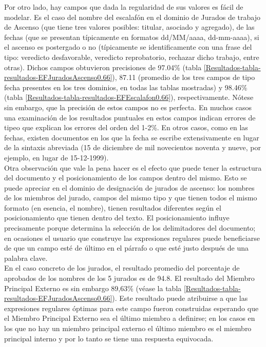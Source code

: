 Por otro lado, hay campos que dada la regularidad de sus valores es fácil de modelar. Es el caso del nombre del escalafón en el dominio de Jurados de trabajo de Ascenso (que tiene tres valores posibles: titular, asociado y agregado), de las fechas (que se presentan típicamente en formatos dd/MM/aaaa, dd-mm-aaaa), si el ascenso es postergado o no (típicamente se identificamente con una frase del tipo: veredicto desfavorable, veredicto reprobatorio, rechazar dicho trabajo, entre otras). Dichos campos obtuvieron precisiones de 97.04\% (tabla \ref{Resultados-tabla-resultados-EFJuradosAscenso0.66}), 87.11 (promedio de los tres campos de tipo fecha presentes en los tres dominios, en todas las tablas mostradas) y 98.46\% (tabla \ref{Resultados-tabla-resultados-EFEscalafon0.66}), respectivamente. Nótese sin embargo, que la precisión de estos campos no es perfecta. En muchos casos una examinación de los resultados puntuales en estos campos indican errores de tipeo que explican los errores del orden del 1-2\%. En otros casos, como en las fechas, existen documentos en los que la fecha se escribe extensivamente en lugar de la sintaxis abreviada (15 de diciembre de mil novecientos noventa y nueve, por ejemplo, en lugar de 15-12-1999). \\

Otra observación que vale la pena hacer es el efecto que puede tener la estructura del documento y el posicionamiento de los campos dentro del mismo. Esto se puede apreciar en el dominio de designación de jurados de ascenso: los nombres de los miembros del jurado, campos del mismo tipo y que tienen todos el mismo formato (en esencia, el nombre), tienen resultados diferentes según el posicionamiento que tienen dentro del texto. El posicionamiento influye precisamente porque determina la selección de los delimitadores del documento; en ocasiones el usuario que construye las expresiones regulares puede beneficiarse de que un campo esté de último en el párrafo o que esté justo después de una palabra clave. \\

En el caso concreto de los jurados, el resultado promedio del porcentaje de aprobados de los nombres de los 5 jurados es de 94.8. El resultado del Miembro Principal Externo es sin embargo 89,63\% (véase la tabla \ref{Resultados-tabla-resultados-EFJuradosAscenso0.66}). Este resultado puede atribuirse a que las expresiones regulares óptimas para este campo fueron construidas esperando que el Miembro Principal Externo sea el último miembro a definirse; en los casos en los que no hay un miembro principal externo el último miembro es el miembro principal interno y por lo tanto se tiene una respuesta equivocada. \\

